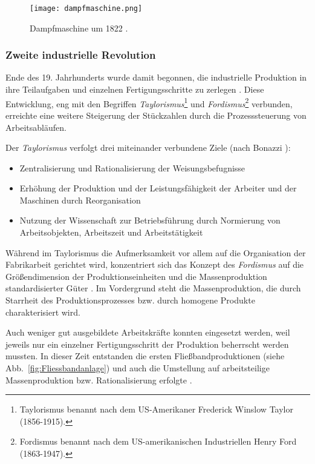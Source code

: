 \begin{figure}%
\centering
\texttt{[image: dampfmaschine.png]} 
\caption{Dampfmaschine um 1822 \cite{SteamEngin1822}.}
\label{fig:Dampfmaschine}
\end{figure}

\subsubsection{Zweite industrielle Revolution}
Ende des 19. Jahrhunderts wurde damit begonnen, die industrielle Produktion in ihre Teilaufgaben und einzelnen Fertigungsschritte zu zerlegen \parencite{andelfinger2017industrie}. Diese Entwicklung, eng mit den Begriffen \textit{Taylorismus}\footnote{Taylorismus benannt nach dem US-Amerikaner Frederick Winslow Taylor (1856-1915).} und \textit{Fordismus}\footnote{Fordismus benannt nach dem US-amerikanischen Industriellen Henry Ford (1863-1947).} verbunden, erreichte eine weitere Steigerung der Stückzahlen durch die Prozesssteuerung von Arbeitsabläufen.

Der \textit{Taylorismus} verfolgt drei miteinander verbundene Ziele (nach Bonazzi \parencite{bonazzi2014geschichte}):

\begin{itemize}
\item Zentralisierung und Rationalisierung der Weisungsbefugnisse
\item Erhöhung der Produktion und der Leistungsfähigkeit der Arbeiter und der Maschinen durch Reorganisation
\item Nutzung der Wissenschaft zur Betriebsführung durch Normierung von Arbeitsobjekten, Arbeitszeit und Arbeitstätigkeit
\end{itemize}

Während im Taylorismus die Aufmerksamkeit vor allem auf die Organisation der Fabrikarbeit gerichtet wird, konzentriert sich das Konzept des \textit{Fordismus} auf die Größendimension der Produktionseinheiten und die Massenproduktion standardisierter Güter \parencite{bonazzi2014geschichte}. Im Vordergrund steht die Massenproduktion, die durch Starrheit des Produktionsprozesses bzw. durch homogene Produkte charakterisiert wird. 

Auch weniger gut ausgebildete Arbeitskräfte konnten eingesetzt werden, weil jeweils nur ein einzelner Fertigungsschritt der Produktion beherrscht werden mussten. In dieser Zeit entstanden die ersten Fließbandproduktionen (siehe Abb.~\ref{fig:Fliessbandanlage}) und auch die Umstellung auf arbeitsteilige Massenproduktion bzw. Rationalisierung erfolgte \parencite{hocker2015}.

